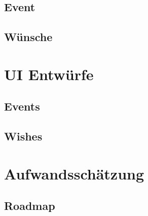 \documentclass[a4paper,12pt]{article}
\begin{document}
\subsection{Event}
\subsection{Wünsche}
\newpage
\section{UI Entwürfe}
\subsection{Events}
\subsection{Wishes}
\newpage
\section{Aufwandsschätzung}
\subsection{Roadmap}
\newpage
\end{document}
